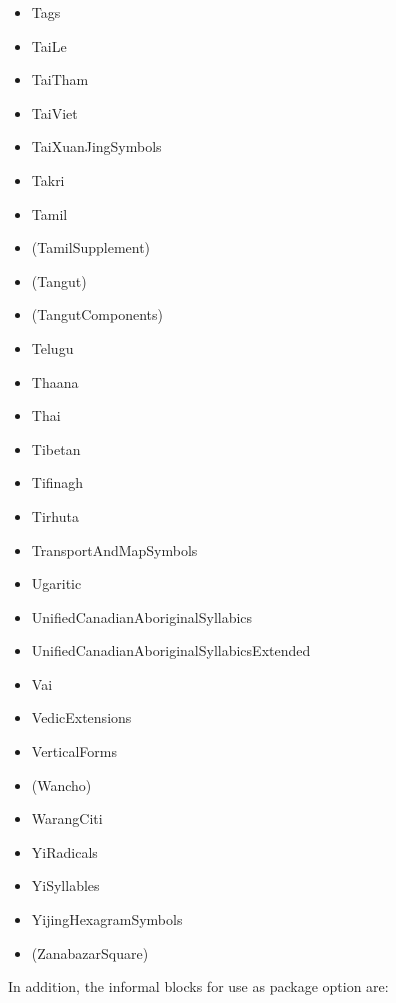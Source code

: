 \documentclass{article}
\newenvironment{itemlist}{%
  \begin{itemize}
	\setlength{\itemsep}{0pt}
	\setlength{\parsep}{0pt}
	\setlength{\topsep}{0pt}
	\setlength{\partopsep}{0pt}
	\setlength{\parskip}{0pt}
	\setlength{\labelsep}{5pt}}%
{
  \end{itemize}}
\begin{document}
\begin{multicols*}{2}
\begin{itemlist}
				\item Tags
				\item TaiLe
				\item TaiTham
				\item TaiViet
				\item TaiXuanJingSymbols
				\item Takri
				\item Tamil
				\item (TamilSupplement)
				\item (Tangut)
				\item (TangutComponents)
				\item Telugu
				\item Thaana
				\item Thai
				\item Tibetan
				\item Tifinagh
				\item Tirhuta
				\item TransportAndMapSymbols
				\item Ugaritic
				\item UnifiedCanadianAboriginalSyllabics
				\item UnifiedCanadianAboriginalSyllabicsExtended
				\item Vai
				\item VedicExtensions
				\item VerticalForms
				\item (Wancho)
				\item WarangCiti
				\item YiRadicals
				\item YiSyllables
				\item YijingHexagramSymbols
				\item (ZanabazarSquare)
			\end{itemlist}
		\end{multicols*}

		In addition, the informal blocks for use as package option are:
\end{document}
